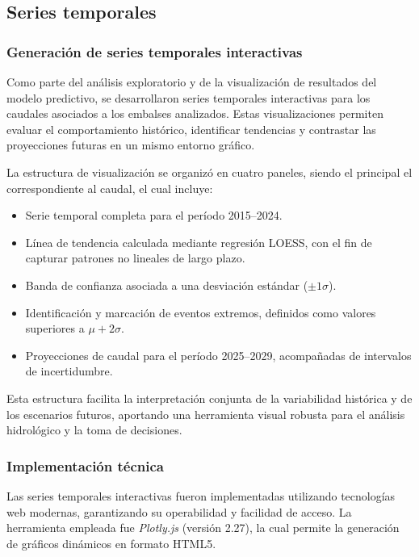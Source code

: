 \subsection{Series temporales}

\subsubsection{Generación de series temporales interactivas}

Como parte del análisis exploratorio y de la visualización de resultados del modelo predictivo, se desarrollaron series temporales interactivas para los caudales asociados a los embalses analizados. Estas visualizaciones permiten evaluar el comportamiento histórico, identificar tendencias y contrastar las proyecciones futuras en un mismo entorno gráfico.

La estructura de visualización se organizó en cuatro paneles, siendo el principal el correspondiente al caudal, el cual incluye:

\begin{itemize}
    \item Serie temporal completa para el período 2015--2024.
    \item Línea de tendencia calculada mediante regresión LOESS, con el fin de capturar patrones no lineales de largo plazo.
    \item Banda de confianza asociada a una desviación estándar ($\pm 1\sigma$).
    \item Identificación y marcación de eventos extremos, definidos como valores superiores a $\mu + 2\sigma$.
    \item Proyecciones de caudal para el período 2025--2029, acompañadas de intervalos de incertidumbre.
\end{itemize}

Esta estructura facilita la interpretación conjunta de la variabilidad histórica y de los escenarios futuros, aportando una herramienta visual robusta para el análisis hidrológico y la toma de decisiones.

\subsubsection{Implementación técnica}

Las series temporales interactivas fueron implementadas utilizando tecnologías web modernas, garantizando su operabilidad y facilidad de acceso. La herramienta empleada fue \textit{Plotly.js} (versión 2.27), la cual permite la generación de gráficos dinámicos en formato HTML5.

